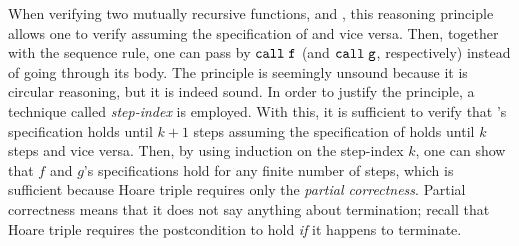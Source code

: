 \noindent When verifying two mutually recursive functions,  and , this reasoning principle allows one to verify  assuming the specification of  and vice versa.
Then, together with the sequence rule, one can pass by $\texttt{call} \; \texttt{f}$ (and $\texttt{call} \; \texttt{g}$, respectively) instead of going through its body.
The principle is seemingly unsound because it is circular reasoning, but %
it is indeed sound. %
In order to justify the principle, a technique called {\it step-index} is employed.
With this, it is sufficient to verify that 's specification holds until $k+1$ steps assuming the specification of  holds until $k$ steps and vice versa.
Then, by using induction on the step-index $k$, one can show that $f$ and $g$'s specifications hold for any finite number of steps, which is sufficient because Hoare triple requires only the {\it partial correctness}.
Partial correctness means that it does not say anything about termination; recall that Hoare triple requires the postcondition to hold {\it if} it happens to terminate.
